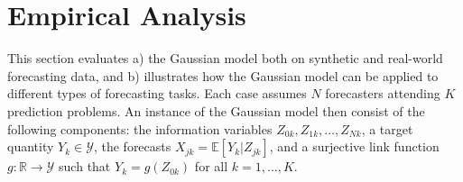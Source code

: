 \documentclass[11pt]{article}
\newcommand{\R}{\mathbb{R}}
\newcommand{\E}{\mathbb{E}}
\theoremstyle{definition}
\theoremstyle{definition}
\def\bSigma{{\bf \Sigma}}
\def\E{{\mathbb E}}
\begin{document}

%
 













\section{Empirical Analysis}
\label{empirical}
This section evaluates a) the Gaussian model both on synthetic and real-world forecasting data, and b) illustrates how the Gaussian model can be applied to different types of forecasting tasks. Each case assumes $N$ forecasters attending $K$ prediction problems. An instance of the Gaussian model then consist of the following components: the information variables $Z_{0k}, Z_{1k}, \dots, Z_{Nk}$, a target quantity $Y_k  \in \mathcal{Y}$, the forecasts $X_{jk} = \E[Y_k | Z_{jk}]$, and a surjective link function $g: \R \to \mathcal{Y}$ such that $Y_k = g(Z_{0k})$ for all $k = 1, \dots, K$.
%
%
\end{document}
